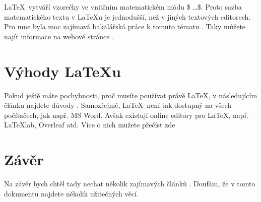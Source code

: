 \documentclass[a4paper, 11pt]{article}
\begin{document}
    \LaTeX\ vytváří vzorečky ve vnitřním matematickém módu \$ \ldots \$. Proto sazba matematického textu v {\LaTeX}u je jednodušší, než v jiných textových editorech. Pro mne byla moc zajímavá bakalářská práce k tomuto tématu \cite{master_2}. Taky můžete najít informace na webové stránce \cite{mat_latex}. 
    
    \section{Výhody {\LaTeX}u}
    
    Pokud ještě máte pochybnosti, proč musíte používat právě {\LaTeX}, v následujícím článku najdete důvody \cite{programujte.com}. Samozřejmě, \LaTeX\ není tak dostupný na všech počítačech, jak např. MS Word. Avšak existují online editory pro {\LaTeX}, např. {\LaTeX}lab, Overleaf atd. Více o nich mužete přečíst zde \cite{master_1}
    
    \section{Závěr}
    
    Na závěr bych chtěl tady nechat několik zajímavých článků \cite{article_2013_1} \cite{article_2013_2} \cite{article_2012}. Doufám, že v tomto dokumentu najdete několik užitečných věcí.
    
    \newpage
    
	\renewcommand{\refname}{Literatura}
	
\end{document}
